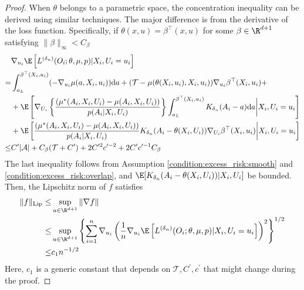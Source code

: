 \begin{proof}
\noindent When $\theta$ belongs to a parametric space, the concentration inequality can be derived using similar techniques. The major difference is from the derivative of the loss function. Specifically, if $\theta(x,u) = \beta^\top(x,u)$ for some $\beta\in \R^{d+1}$ satisfying $\|\beta\|_\infty< C_\beta$
\begin{align*}
    &\nabla_{u_i} \E\left[L^{({\delta_n})}(O_i;\theta,\mu, p)|X_i,U_i = u_i\right]\\
    = & \int_{a_L}^{\beta^\top(X_i,u_i)}(-\nabla_{u_i}\mu(a,X_i,u_i))\mathrm{d}a + (\mathcal{T}-\mu(\theta(X_i,u_i),X_i,u_i))\nabla_{u_i}\beta^\top(X_i,u_i)+\\
    & +
 \E\left[\nabla_{U_i}\left\{\frac{(\mu^*(A_i,X_i,U_i) - \mu(A_i,X_i,U_i))}{ p(A_{i}|X_{i},U_{i})}\right\} \int_{a_L}^{\beta^\top(X_i,u_i)}K_{\delta_n}(A_i-a)\mathrm{d}a\bigg|X_i,U_i = u_i\right]\\
    & + \E\left[\frac{(\mu^*(A_i,X_i,U_i) - \mu(A_i,X_i,U_i))}{ p(A_{i}|X_{i},U_{i})}K_{\delta_n}(A_i-\theta(X_i,U_i))\nabla_{U_i}\beta^\top(X_i,u_i)\bigg|X_i,U_i = u_i\right]\\
    \leq & C^\prime|\mathcal{A}| + C_\beta(\mathcal{T}+C^\prime) + 2C^{\prime2} c^{\prime-2} + 2C^\prime c^{\prime-1}C_\beta
\end{align*}
The last inequality follows from Assumption \ref{condition:excess_risk:smooth} and \ref{condition:excess_risk:overlap}, and $\E[K_{\delta_n}(A_i - \theta(X_i,U_i))|X_i,U_i]$ be bounded. Then, the Lipschitz norm of $f$ satisfies
\begin{align*}
    \|f\|_{\text{Lip}}\leq & \sup_{u\in\R^{d+1}}\|\nabla f\|\\
    \leq& \sup_{u\in\R^{d+1}}\left\{\sum_{i=1}^n \nabla_{u_i}\left(\frac{1}{n}\nabla_{u_i} \E\left[L^{({\delta_n})}(O_i;\theta,\mu, p)|X_i,U_i = u_i\right]\right)^2\right\}^{1/2}\\
    \leq & c_1 n^{-1/2}
\end{align*}
Here, $c_1$ is a generic constant that depends on $\mathcal{T},C^\prime,c^\prime$ that might change during the proof.


\end{proof}
